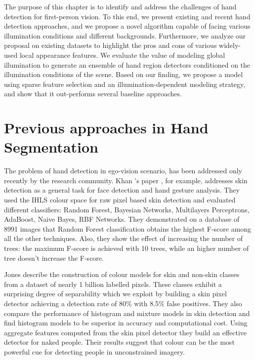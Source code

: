 The purpose of this chapter is to identify and address the
challenges of hand detection for first-person vision. To this
end, we present existing and recent hand detection approaches, and we propose a novel algorithm capable of facing
various illumination conditions and different backgrounds. Furthermore, we analyze our proposal on existing datasets to highlight the pros and cons of various widely-used local appearance features. We
evaluate the value of modeling global illumination to generate
an ensemble of hand region detectors conditioned on the
illumination conditions of the scene. Based on our finding,
we propose a model using sparse feature selection and an
illumination-dependent modeling strategy, and show that it
out-performs several baseline approaches.

\section{Previous approaches in Hand Segmentation}
The problem of hand detection  in ego-vision scenario, has been addressed only recently by the research community. Khan \etal's paper \cite{khan10}, for example, addresses skin detection as a general task for face detection and hand gesture analysis. They used the IHLS colour space for raw pixel based skin detection and evaluated different classifiers: Random Forest, Bayesian Networks, Multilayers Perceptrons, AdaBoost, Naive Bayes, RBF Networks. They demonstrated on a database of 8991 images that Random Forest classification obtains the highest F-score among all the other techniques. Also, they show the effect of increasing the number of trees: the maximum F-score is achieved with 10 trees, while an higher number of tree doesn't increase the F-score.

Jones \etal \cite{jones99} describe the construction of colour models for skin and non-skin classes from a dataset of nearly 1 billion labelled pixels. These classes exhibit a surprising degree of separability which we exploit by building a skin pixel detector achieving a detection rate of 80\% with 8.5\% false positives. They also compare the performance of histogram and mixture models in skin detection and find histogram models to be superior in accuracy and computational cost. Using aggregate features computed from the
skin pixel detector they build an effective detector for naked people. Their results suggest that colour can be the most powerful cue for detecting people in unconstrained imagery.

